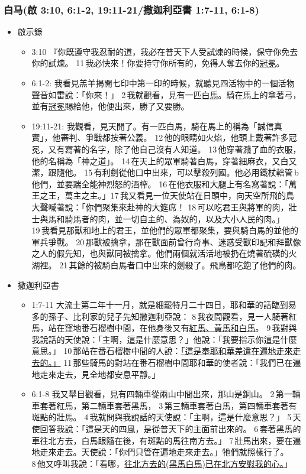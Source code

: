 \subsubsection{白马(啟 3:10, 6:1-2, 19:11-21/撒迦利亞書 1:7-11, 6:1-8)}
\begin{itemize}
\itemsep-.25em
\item 啟示錄
\begin{itemize}
\itemsep-.25em
\item 3:10 『你既遵守我忍耐的道，我必在普天下人受試煉的時候，保守你免去你的試煉。 11 我必快來！你要持守你所有的，免得人奪去你的\underline{冠冕}。
\item 6:1-2: 我看見羔羊揭開七印中第一印的時候，就聽見四活物中的一個活物聲音如雷說：「你來！」 2 我就觀看，見有一匹\underline{白馬}。騎在馬上的拿著弓，並有\underline{冠冕}賜給他，他便出來，勝了又要勝。
\item 19:11-21: 我觀看，見天開了。有一匹白馬，騎在馬上的稱為「誠信真實」，他審判、爭戰都按著公義。 12 他的眼睛如火焰，他頭上戴著許多冠冕，又有寫著的名字，除了他自己沒有人知道。 13 他穿著濺了血的衣服，他的名稱為「神之道」。 14 在天上的眾軍騎著白馬，穿著細麻衣，又白又潔，跟隨他。 15 有利劍從他口中出來，可以擊殺列國。他必用鐵杖轄管 b他們，並要踹全能神烈怒的酒榨。 16 在他衣服和大腿上有名寫著說：「萬王之王，萬主之主。」17 我又看見一位天使站在日頭中，向天空所飛的鳥大聲喊著說：「你們聚集來赴神的大筵席！ 18 可以吃君王與將軍的肉，壯士與馬和騎馬者的肉，並一切自主的、為奴的，以及大小人民的肉。」19 我看見那獸和地上的君王，並他們的眾軍都聚集，要與騎白馬的並他的軍兵爭戰。 20 那獸被擒拿，那在獸面前曾行奇事、迷惑受獸印記和拜獸像之人的假先知，也與獸同被擒拿。他們兩個就活活地被扔在燒著硫磺的火湖裡。 21 其餘的被騎白馬者口中出來的劍殺了。飛鳥都吃飽了他們的肉。
\end{itemize}
\item 撒迦利亞書
\begin{itemize}
\itemsep-.25em
\item 1:7-11 大流士第二年十一月，就是細罷特月二十四日，耶和華的話臨到易多的孫子、比利家的兒子先知撒迦利亞說： 8 我夜間觀看，見一人騎著紅馬，站在窪地番石榴樹中間，在他身後又有\underline{紅馬、黃馬和白馬}。 9 我對與我說話的天使說：「主啊，這是什麼意思？」他說：「我要指示你這是什麼意思。」 10 那站在番石榴樹中間的人說：\underline{「這是奉耶和華差遣在遍地走來走去的。」} 11 那些騎馬的對站在番石榴樹中間耶和華的使者說：「我們已在遍地走來走去，見全地都安息平靜。」
\item 6:1-8 我又舉目觀看，見有四輛車從兩山中間出來，那山是銅山。 2 第一輛車套著紅馬，第二輛車套著黑馬， 3 第三輛車套著白馬，第四輛車套著有斑點的壯馬。 4 我就問與我說話的天使說：「主啊，這是什麼意思？」 5 天使回答我說：「這是天的四風，是從普天下的主面前出來的。 6 套著黑馬的車往北方去，白馬跟隨在後，有斑點的馬往南方去。」 7 壯馬出來，要在遍地走來走去。天使說：「你們只管在遍地走來走去。」牠們就照樣行了。 8 他又呼叫我說：「看哪，\underline{往北方去的(黑馬白馬)已在北方安慰我的心。}」
\end{itemize}
\end{itemize}

